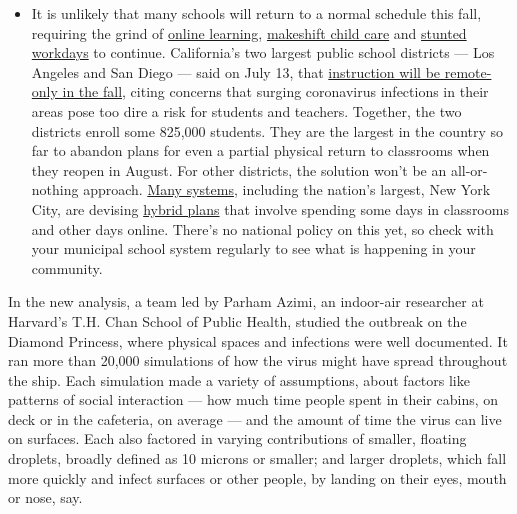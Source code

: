 \begin{itemize}
  \begin{itemize}
  \tightlist
  \item
    It is unlikely that many schools will return to a normal schedule
    this fall, requiring the grind of
    \href{https://www.nytimes3xbfgragh.onion/2020/06/05/us/coronavirus-education-lost-learning.html?action=click\&pgtype=Article\&state=default\&region=MAIN_CONTENT_3\&context=storylines_faq}{online
    learning},
    \href{https://www.nytimes3xbfgragh.onion/2020/05/29/us/coronavirus-child-care-centers.html?action=click\&pgtype=Article\&state=default\&region=MAIN_CONTENT_3\&context=storylines_faq}{makeshift
    child care} and
    \href{https://www.nytimes3xbfgragh.onion/2020/06/03/business/economy/coronavirus-working-women.html?action=click\&pgtype=Article\&state=default\&region=MAIN_CONTENT_3\&context=storylines_faq}{stunted
    workdays} to continue. California's two largest public school
    districts --- Los Angeles and San Diego --- said on July 13, that
    \href{https://www.nytimes3xbfgragh.onion/2020/07/13/us/lausd-san-diego-school-reopening.html?action=click\&pgtype=Article\&state=default\&region=MAIN_CONTENT_3\&context=storylines_faq}{instruction
    will be remote-only in the fall}, citing concerns that surging
    coronavirus infections in their areas pose too dire a risk for
    students and teachers. Together, the two districts enroll some
    825,000 students. They are the largest in the country so far to
    abandon plans for even a partial physical return to classrooms when
    they reopen in August. For other districts, the solution won't be an
    all-or-nothing approach.
    \href{https://bioethics.jhu.edu/research-and-outreach/projects/eschool-initiative/school-policy-tracker/}{Many
    systems}, including the nation's largest, New York City, are
    devising
    \href{https://www.nytimes3xbfgragh.onion/2020/06/26/us/coronavirus-schools-reopen-fall.html?action=click\&pgtype=Article\&state=default\&region=MAIN_CONTENT_3\&context=storylines_faq}{hybrid
    plans} that involve spending some days in classrooms and other days
    online. There's no national policy on this yet, so check with your
    municipal school system regularly to see what is happening in your
    community.
  \end{itemize}
\end{itemize}

In the new analysis, a team led by Parham Azimi, an indoor-air
researcher at Harvard's T.H. Chan School of Public Health, studied the
outbreak on the Diamond Princess, where physical spaces and infections
were well documented. It ran more than 20,000 simulations of how the
virus might have spread throughout the ship. Each simulation made a
variety of assumptions, about factors like patterns of social
interaction --- how much time people spent in their cabins, on deck or
in the cafeteria, on average --- and the amount of time the virus can
live on surfaces. Each also factored in varying contributions of
smaller, floating droplets, broadly defined as 10 microns or smaller;
and larger droplets, which fall more quickly and infect surfaces or
other people, by landing on their eyes, mouth or nose, say.

